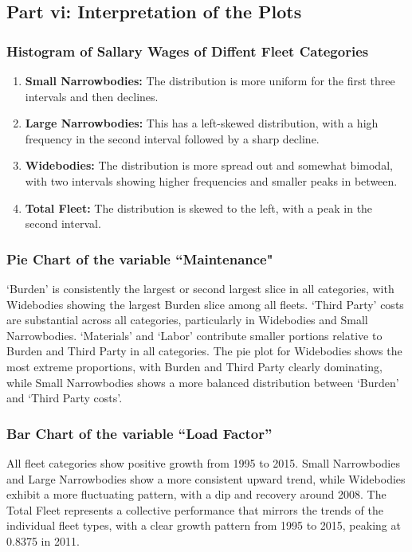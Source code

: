 \subsection{Part vi: Interpretation of the Plots}
\subsubsection{Histogram of Sallary Wages of Diffent Fleet Categories}

\begin{enumerate}
    \item \textbf{Small Narrowbodies:} The distribution is more uniform for the first three intervals and then declines.
    \item \textbf{Large Narrowbodies:} This has a left-skewed distribution, with a high frequency in the second interval followed by a sharp decline.
    \item \textbf{Widebodies:} The distribution is more spread out and somewhat bimodal, with two intervals showing higher frequencies and smaller peaks in between.
    \item \textbf{Total Fleet:} The distribution is skewed to the left, with a peak in the second interval.
\end{enumerate}

\subsubsection{Pie Chart of the variable ``Maintenance"}
`Burden' is consistently the largest or second largest slice in all categories, with Widebodies showing the largest Burden slice among all fleets.
`Third Party' costs are substantial across all categories, particularly in Widebodies and Small Narrowbodies.
`Materials' and `Labor' contribute smaller portions relative to Burden and Third Party in all categories.
The pie plot for Widebodies shows the most extreme proportions, with Burden and Third Party clearly dominating, while Small Narrowbodies shows a more balanced distribution between `Burden' and `Third Party costs'.

\subsubsection{Bar Chart of the variable “Load Factor”}
All fleet categories show positive growth from 1995 to 2015.
Small Narrowbodies and Large Narrowbodies show a more consistent upward trend, while Widebodies exhibit a more fluctuating pattern, with a dip and recovery around 2008.
The Total Fleet represents a collective performance that mirrors the trends of the individual fleet types, with a clear growth pattern from 1995 to 2015, peaking at 0.8375 in 2011.

